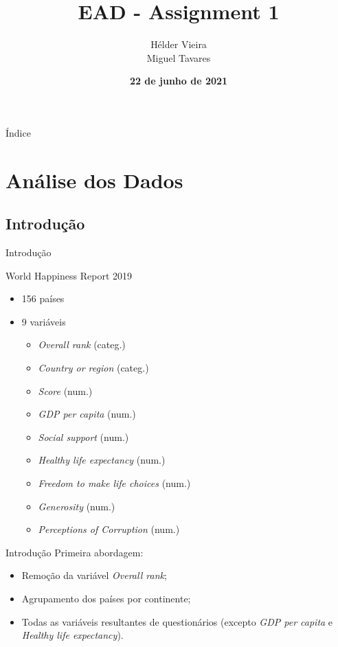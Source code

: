 \documentclass[xcolor=dvipsnames,table]{beamer}
\title{EAD - Assignment 1}
\author{
  Hélder Vieira \\ Miguel Tavares
  }
\institute{
  Estatística e Análise de Dados \\ MDS}
\date{\textbf{22 de junho de 2021} }
\begin{document}
	\begin{frame}
		\titlepage
	\end{frame}


	\begin{frame}{Índice}
		\tableofcontents
	\end{frame}
	
	\section{Análise dos Dados}
	\subsection{Introdução}
	
	\begin{frame}{Introdução}
	    \begin{block}{World Happiness Report 2019}
	        \begin{itemize}
				\item 156 países
				\item 9 variáveis
				\begin{itemize}
				    \item \textit{Overall rank} (categ.)
				    \item \textit{Country or region} (categ.)
				    \item \textit{Score} (num.)
				    \item \textit{GDP per capita} (num.)
				    \item \textit{Social support} (num.)
				    \item \textit{Healthy life expectancy} (num.)
				    \item \textit{Freedom to make life choices} (num.)
				    \item \textit{Generosity} (num.)
				    \item \textit{Perceptions of Corruption} (num.)
				\end{itemize}
			\end{itemize}
		\end{block}
	\end{frame}
	
	\begin{frame}{Introdução}
	    Primeira abordagem:
	        \begin{itemize}
				\item Remoção da variável \textit{Overall rank};
				\item Agrupamento dos países por continente;
				\item Todas as variáveis resultantes de questionários (excepto \textit{GDP per capita} e \textit{Healthy life expectancy}).
			\end{itemize}
	\end{frame}
	
\end{document}
